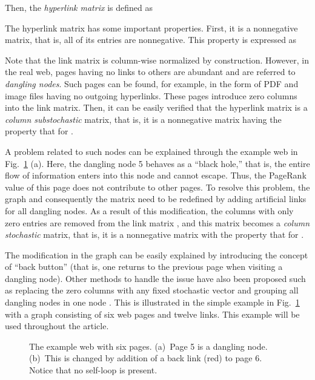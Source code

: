 \documentclass[11pt,draftcls,onecolumn]{IEEEtran}
\begin{document}
Then, the {\it hyperlink matrix}  is defined as

The hyperlink matrix  has some important properties. First, it is a nonnegative matrix, 
that is, all of its entries   are nonnegative. This property is expressed as

Note that the link matrix is column-wise normalized by construction. 
However, in the real web, pages having no links to others are abundant and
are referred to {\it dangling nodes}. 
Such pages can be found, for example, in the form of PDF and image files
having no outgoing hyperlinks. These pages introduce zero columns into the link matrix. 
Then, it can be easily verified that the 
hyperlink matrix  is a {\it column substochastic} matrix, that is, 
it is a nonnegative matrix  having  
the property that  for .

A problem related to such nodes can be explained through 
the example web in Fig.~\ref{fig:graph} (a). Here, the dangling node 5 behaves as a ``black hole,''
that is, the entire flow of information enters into this node and cannot escape.
Thus, the PageRank value of this page does not contribute to other pages.
To resolve this problem, the graph and consequently the matrix 
need to be redefined by adding artificial links for 
all dangling nodes. As a result of this modification, the columns with only zero entries 
are removed from the link matrix , and this matrix  becomes a {\it column stochastic} matrix, 
that is, it is a nonnegative matrix 
with the property that  for .

The modification in the graph can be easily explained by introducing the concept of ``back button''
(that is, one returns to the previous page when visiting a dangling node).
Other methods to handle the issue have also been proposed such as replacing the zero columns
with any fixed stochastic vector and grouping all dangling nodes in one node \cite{LanMey:06,IpsSel:07}.
This is illustrated in the simple example in Fig.~\ref{fig:graph}
with a graph consisting of six web pages and twelve links. 
This example will be used throughout the article.



\begin{figure}[t]
  \centering
  \caption{The example web with six pages. (a)~Page 5 is a dangling node. 
           (b)~This is changed by addition of a back link (red) to page 6. 
            Notice that no self-loop is present.
}
\label{fig:graph}
\end{figure}
\end{document}
